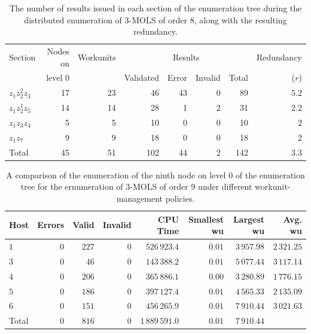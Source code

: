  \begin{table}[htb]
 \centering
 \caption{The number of results issued in each section of the enumeration tree during the distributed enumeration of 3-MOLS of order 8, along with the resulting redundancy.}
\begin{tabular}{lrrrrrrr}
\toprule
Section & Nodes on    & Workunits & \multicolumn{4}{c}{Results} & Redundancy  \\
\cmidrule(lr){4-7}
 &level 0 && Validated & Error  & Invalid & Total &($r$)      \\ \midrule 
$z_1z_2^2z_3$ & 17& 23&46&43& 0& 89&$5.2$  \\ 
$z_1z_2^1z_5$ &14&14&28&1& 2&31&$2.2$   \\ 
$z_1z_3z_4$& 5&5&10&0&0&10& $2$    \\ 
$z_1z_7$ & 9&9&18&0&0&18&$2$   \\ \midrule
Total &45 &51&102&44&2&142&$3.3$   \\ \bottomrule
\end{tabular}\vspace*{.4cm}
\label{83splitsum}
\end{table} 

\begin{table}[htb]
 \centering
 \caption{A comparison of the enumeration of the ninth node on level 0 of the enumeration tree for the ernumeration of 3-MOLS of order 9 under different workunit-management policies.}
\begin{tabular}{lrrrrrrr}
\toprule
Host & Errors & Valid & Invalid   & CPU Time& Smallest wu & Largest wu& Avg. wu\\ \midrule
$1$ & $0$ & $227$ & $0$   & $526\,923.4$ & $0.01$ & $3\,957.98$ & $2\,321.25$ \\
$3$ & $0$ & $46$ & $0$   & $143\,388.2$ & $0.01$ & $5\,077.44$ & $3\,117.14$ \\
$4$ & $0$ & $206$ & $0$   & $365\,886.1$ & $0.00$ & $3\,280.89$ & $1\,776.15$ \\
$5$ & $0$ & $186$ & $0$   & $397\,127.4$ & $0.01$ & $4\,565.33$ & $2\,135.09$ \\
$6$ & $0$ & $151$ & $0$   & $456\,265.9$ & $0.01$ & $7\,910.44$ & $3\,021.63$ \\ \midrule
Total & $0$ & $816$ & $0$  & $1\,889\,591.0$ & $0.01$ & $7\,910.44$\\ \bottomrule
\end{tabular}\vspace*{-.4cm}
\label{83splithost}
\end{table}



